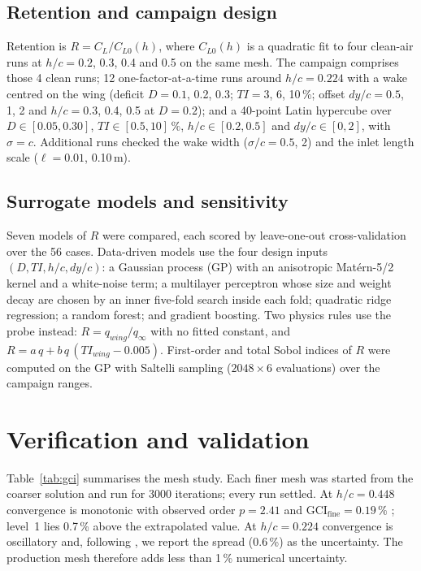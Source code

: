 \documentclass[11pt,a4paper]{article}
\begin{document}
\subsection{Retention and campaign design}
Retention is $R = C_L / C_{L0}(h)$, where $C_{L0}(h)$ is a quadratic fit to four clean-air runs at $h/c = 0.2$, 0.3, 0.4 and 0.5 on the same mesh. The campaign comprises those 4 clean runs; 12 one-factor-at-a-time runs around $h/c = 0.224$ with a wake centred on the wing (deficit $D = 0.1$, 0.2, 0.3; $TI = 3$, 6, 10\,\%; offset $dy/c = 0.5$, 1, 2 and $h/c = 0.3$, 0.4, 0.5 at $D = 0.2$); and a 40-point Latin hypercube over $D \in [0.05, 0.30]$, $TI \in [0.5, 10]\,\%$, $h/c \in [0.2, 0.5]$ and $dy/c \in [0, 2]$, with $\sigma = c$. Additional runs checked the wake width ($\sigma/c = 0.5$, 2) and the inlet length scale ($\ell = 0.01$, 0.10\,m).

\subsection{Surrogate models and sensitivity}
Seven models of $R$ were compared, each scored by leave-one-out cross-validation over the 56 cases. Data-driven models use the four design inputs $(D, TI, h/c, dy/c)$: a Gaussian process (GP) with an anisotropic Mat\'ern-5/2 kernel and a white-noise term; a multilayer perceptron whose size and weight decay are chosen by an inner five-fold search inside each fold; quadratic ridge regression; a random forest; and gradient boosting. Two physics rules use the probe instead: $R = q_{wing}/q_\infty$ with no fitted constant, and $R = a\,q + b\,q\,(TI_{wing} - 0.005)$. First-order and total Sobol indices of $R$ were computed on the GP with Saltelli sampling ($2048 \times 6$ evaluations) over the campaign ranges.

\section{Verification and validation}
Table~\ref{tab:gci} summarises the mesh study. Each finer mesh was started from the coarser solution and run for 3000 iterations; every run settled. At $h/c = 0.448$ convergence is monotonic with observed order $p = 2.41$ and $\mathrm{GCI_{fine}} = 0.19\,\%$ \cite{celik2008}; level~1 lies 0.7\,\% above the extrapolated value. At $h/c = 0.224$ convergence is oscillatory and, following \cite{celik2008}, we report the spread (0.6\,\%) as the uncertainty. The production mesh therefore adds less than 1\,\% numerical uncertainty.
\end{document}
